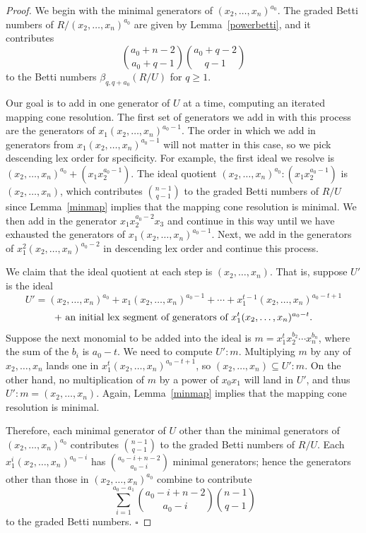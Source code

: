 \documentclass{article}
\begin{document}
\begin{proof}
We begin with the minimal generators of $(x_2,\dots,x_n)^{a_0}$. The graded Betti numbers of $R/(x_2,\dots,x_n)^{a_0}$ are given by Lemma~\ref{powerbetti}, and it contributes \[ {a_0+n-2 \choose a_0+q-1}{a_0+q-2 \choose q-1} \] to the Betti numbers $\beta_{q,q+a_0}(R/U)$ for $q \ge 1$.

Our goal is to add in one generator of $U$ at a time, computing an iterated mapping cone resolution. The first set of generators we add in with this process are the generators of $x_1(x_2,\dots,x_n)^{a_0-1}$. The order in which we add in generators from $x_1(x_2,\dots,x_n)^{a_0-1}$ will not matter in this case, so we pick descending lex order for specificity. For example, the first ideal we resolve is $(x_2,\dots,x_n)^{a_0}+(x_1x_2^{a_0-1})$. The ideal quotient $(x_2,\dots,x_n)^{a_0}:(x_1x_2^{a_0-1})$ is $(x_2,\dots,x_n)$, which contributes ${n-1 \choose q-1}$ to the graded Betti numbers of $R/U$ since Lemma~\ref{minmap} implies that the mapping cone resolution is minimal. We then add in the generator $x_1x_2^{a_0-2}x_3$ and continue in this way until we have exhausted the generators of $x_1(x_2,\dots,x_n)^{a_0-1}$. Next, we add in the generators of $x_1^2(x_2,\dots,x_n)^{a_0-2}$ in descending lex order and continue this process.

We claim that the ideal quotient at each step is $(x_2,\dots,x_n)$. That is, suppose $U'$ is the ideal \[ U'=(x_2,\dots,x_n)^{a_0} + x_1(x_2,\dots,x_n)^{a_0-1} +\cdots + x_1^{t-1}(x_2,\dots,x_n)^{a_0-t+1} \] \[ + \hbox{ an initial lex segment of generators of } x_1^t(x_2,\dots,x_n)^{a_0-t}.\] Suppose the next monomial to be added into the ideal is $m=x_1^tx_2^{b_2}\cdots x_n^{b_n}$, where the sum of the $b_i$ is $a_0-t$. We need to compute $U':m$. Multiplying $m$ by any of $x_2,\dots,x_n$ lands one in $x_1^{t}(x_2,\dots,x_n)^{a_0-t+1}$, so $(x_2,\dots,x_n) \subseteq U':m$. On the other hand, no multiplication of $m$ by a power of $x_0x_1$ will land in $U'$, and thus $U':m=(x_2,\dots,x_n)$. Again, Lemma~\ref{minmap} implies that the mapping cone resolution is minimal.

Therefore, each minimal generator of $U$ other than the minimal generators of $(x_2,\dots,x_n)^{a_0}$ contributes ${n-1 \choose q-1}$ to the graded Betti numbers of $R/U$. Each $x_1^{i}(x_2,\dots,x_n)^{a_0-i}$ has ${a_0-i+n-2 \choose a_0-i}$ minimal generators; hence the generators other than those in $(x_2,\dots,x_n)^{a_0}$ combine to contribute \[ \sum_{i=1}^{a_0-a_1} {a_0-i+n-2 \choose a_0-i}{n-1 \choose q-1} \] to the graded Betti numbers. \hfill $\square$
\end{proof}
\end{document}
